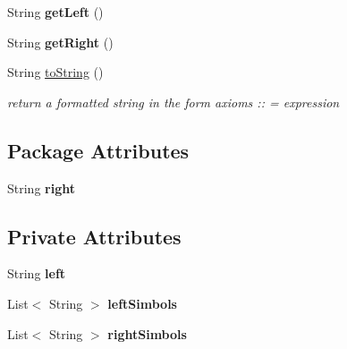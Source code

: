 \begin{DoxyCompactItemize}
\item 
\hypertarget{classcontext_free_1_1grammar_1_1_production_a6b42819c4b8af1aa759edf3ad5978f67}{String {\bfseries get\-Left} ()}\label{classcontext_free_1_1grammar_1_1_production_a6b42819c4b8af1aa759edf3ad5978f67}

\item 
\hypertarget{classcontext_free_1_1grammar_1_1_production_a0b6496bc60eefe88fd4652a6f01ec15e}{String {\bfseries get\-Right} ()}\label{classcontext_free_1_1grammar_1_1_production_a0b6496bc60eefe88fd4652a6f01ec15e}

\item 
\hypertarget{classcontext_free_1_1grammar_1_1_production_a43d78cd85446efbbffe59a2278c410d1}{String \hyperlink{classcontext_free_1_1grammar_1_1_production_a43d78cd85446efbbffe59a2278c410d1}{to\-String} ()}\label{classcontext_free_1_1grammar_1_1_production_a43d78cd85446efbbffe59a2278c410d1}

\begin{DoxyCompactList}\small\item\em return a formatted string in the form axioms \-:\-: = expression \end{DoxyCompactList}\end{DoxyCompactItemize}
\subsection*{Package Attributes}
\begin{DoxyCompactItemize}
\item 
\hypertarget{classcontext_free_1_1grammar_1_1_production_ab72c30da44fb1fbf41b9a70bf799ef58}{String {\bfseries right}}\label{classcontext_free_1_1grammar_1_1_production_ab72c30da44fb1fbf41b9a70bf799ef58}

\end{DoxyCompactItemize}
\subsection*{Private Attributes}
\begin{DoxyCompactItemize}
\item 
\hypertarget{classcontext_free_1_1grammar_1_1_production_ad188a705cd57d55d32fd198e6af71f75}{String {\bfseries left}}\label{classcontext_free_1_1grammar_1_1_production_ad188a705cd57d55d32fd198e6af71f75}

\item 
\hypertarget{classcontext_free_1_1grammar_1_1_production_ae726278e9261fd332c0afcdc348735e8}{List$<$ String $>$ {\bfseries left\-Simbols}}\label{classcontext_free_1_1grammar_1_1_production_ae726278e9261fd332c0afcdc348735e8}

\item 
\hypertarget{classcontext_free_1_1grammar_1_1_production_aa19049895b51192f5e151dc2a3894865}{List$<$ String $>$ {\bfseries right\-Simbols}}\label{classcontext_free_1_1grammar_1_1_production_aa19049895b51192f5e151dc2a3894865}

\end{DoxyCompactItemize}


